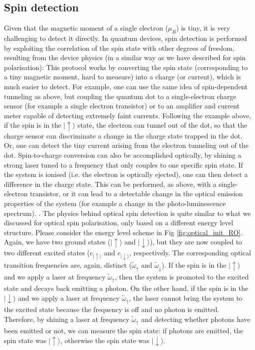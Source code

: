 \documentclass[a4paper,11pt]{article}
\newcommand{\ket}[1]{| #1 \rangle}
\begin{document}
\subsection {Spin detection}
Given that the magnetic moment of a single electron ($\mu_B$) is tiny, it is very challenging to detect it directly. In quantum devices, spin detection is performed by exploiting the correlation of the spin state with other degrees of freedom, resulting from the device physics (in a similar way as we have described for spin polarisation):
 This protocol works by converting the spin state (corresponding to a tiny magnetic moment, hard to measure) into a charge (or current), which is much easier to detect. For example, one can use the same idea of spin-dependent tunneling as above, but coupling the quantum dot to a single-electron charge sensor (for example a single electron transistor) or to an amplifier and current meter capable of detecting extremely faint currents. Following the example above, if the spin is in the $\ket{\uparrow}$ state, the electron can tunnel out of the dot, so that the charge sensor can discriminate a change in the charge state trapped in the dot. Or, one can detect the tiny current arising from the electron tunneling out of the dot.
\newline Spin-to-charge conversion can also be accomplished optically, by shining a strong laser tuned to a frequency that only couples to one specific spin state. If the system is ionised (i.e. the electron is optically ejected), one can then detect a difference in the charge state. This can be performed, as above, with a single-electron transistor, or it can lead to a detectable change in the optical emission properties of the system (for example a change in the photo-luminescence spectrum).
. The physics behind optical spin detection is quite similar to what we discussed for optical spin polarisation, only based on a different energy level structure. Please consider the energy level scheme in Fig \ref{fig:optical_init_RO}. Again, we have two ground states ($\ket{\uparrow}$ and $\ket{\downarrow}$), but they are now coupled to two different excited states ($e_{\ket{\uparrow}}$ and $e_{\ket{\downarrow}}$, respectively. The corresponding optical transition frequencies are, again, distinct ($\tilde{\omega}_{\uparrow}$ and $\tilde{\omega}_{\downarrow}$). If the spin is in the $\ket{\uparrow}$ and we apply a laser at frequency $\tilde{\omega}_{\uparrow}$, then the system is promoted to the excited state and decays back emitting a photon. On the other hand, if the spin is in the $\ket{\downarrow}$ and we apply a laser at frequency $\tilde{\omega}_{\uparrow}$, the laser cannot bring the system to the excited state because the frequency is off and no photon is emitted. Therefore, by shining a laser at frequency $\tilde{\omega}_{\uparrow}$ and detecting whether photons have been emitted or not, we can measure the spin state: if photons are emitted, the spin state was $\ket{\uparrow}$, otherwise the spin state was $\ket{\downarrow}$.
\end{document}

